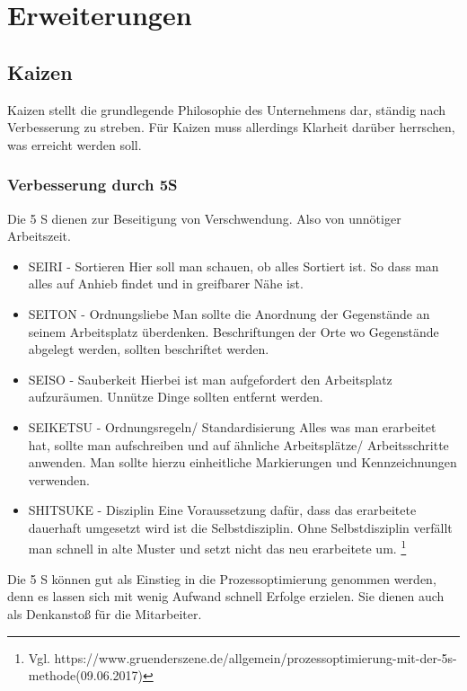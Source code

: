 \documentclass[00_ToyotaProduktionssystem.tex]{subfiles}
\begin{document}
\section{Erweiterungen}

\subsection{Kaizen}
\label{sec:KAIZEN}
Kaizen stellt die grundlegende Philosophie des Unternehmens dar, ständig nach Verbesserung zu streben. Für Kaizen muss allerdings Klarheit darüber herrschen, was erreicht werden soll. 


\subsubsection{Verbesserung durch 5S}
Die 5 S dienen zur Beseitigung von Verschwendung. Also von unnötiger Arbeitszeit.

\begin{itemize}
\item{SEIRI - Sortieren} Hier soll man schauen, ob alles Sortiert ist. So dass man alles auf Anhieb findet und in greifbarer Nähe ist. 
\item{SEITON - Ordnungsliebe} Man sollte die Anordnung der Gegenstände an seinem Arbeitsplatz überdenken. Beschriftungen der Orte wo Gegenstände abgelegt werden, sollten beschriftet werden.
\item{SEISO - Sauberkeit} Hierbei ist man aufgefordert den Arbeitsplatz aufzuräumen. Unnütze Dinge sollten entfernt werden. 
\item{SEIKETSU - Ordnungsregeln/ Standardisierung} Alles was man erarbeitet hat, sollte man aufschreiben und auf ähnliche Arbeitsplätze/ Arbeitsschritte anwenden.  Man sollte hierzu einheitliche Markierungen und Kennzeichnungen verwenden. 
\item{SHITSUKE - Disziplin} Eine Voraussetzung dafür, dass das erarbeitete dauerhaft umgesetzt wird ist die Selbstdisziplin. Ohne Selbstdisziplin verfällt man schnell in alte Muster und setzt nicht das neu erarbeitete um.
\footnote{Vgl.  https://www.gruenderszene.de/allgemein/prozessoptimierung-mit-der-5s-methode(09.06.2017)}
\end{itemize}

Die 5 S können gut als Einstieg in die Prozessoptimierung genommen werden, denn es lassen sich mit wenig Aufwand schnell Erfolge erzielen. Sie dienen auch als Denkanstoß für die Mitarbeiter.
\end{document}
